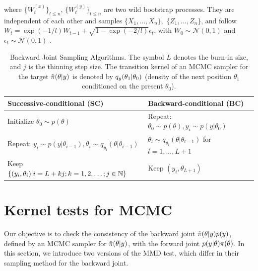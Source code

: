 \documentclass{article}
\newcommand{\tildepi}{\tilde{\pi}}
\begin{document}
where $\{W_{t}^{(x)}\}_{t\leq n}$, $\{W_{t}^{(y)}\}_{t\leq n}$ are two wild bootstrap processes.
They are independent of each other and samples $\{X_1, \dots, X_n\},$ $\{Z_1, \dots, Z_n\}$, and follow $W_{t}=\exp(-1/l) W_{t-1}+\sqrt{1-\exp(-2/{l})}\epsilon_{t}$,
with $W_{0} \sim \mathcal{N}(0,1)$ and $\epsilon_{t} \sim \mathcal{N}(0,1)$ \cite[see, ][]{chwialkowski_wild_2014, leucht_dependent_2013}.


\begin{table}[b]
    \caption{Backward Joint Sampling Algorithms. The symbol $L$ denotes the burn-in size, and $j$ is the thinning step size.
    The transition kernel of an MCMC sampler for the target $\tildepi(\theta\given y)$ is denoted by $q_{y}(\theta_{1} \vert \theta_0)$ (density of the next position $\theta_1$ conditioned on the present $\theta_0$). 
    }
    \label{tab:sampling}
    \centering
    \begin{tabular}{l|l}
    \toprule
        Successive-conditional (SC) & Backward-conditional (BC) \\
    \midrule  
    
    Initialize $\theta_{0} \sim p(\theta)$                                      & Repeat: $\theta_{0} \sim p(\theta), y_{i} \sim p(y|\theta_{0})$ \\
    Repeat: $y_{i} \sim p(y|\theta_{i-1}), \theta_{i} \sim q_{y_i}(\theta|\theta_{i-1})$   & \qquad $\theta_{l} \sim q_{y_i}(\theta|\theta_{l-1})$ for $l=1,...,L+1$ \\
    Keep $\{(y_{i}, \theta_{i}) \vert i=L+kj; k=1,2,\ldots; j\in\mathbb{N} \}$                     & \qquad Keep $(y_{i}, \theta_{L+1})$ \\
    \bottomrule
    \end{tabular}
\end{table}
\section{Kernel tests for MCMC}
Our objective is to check the consistency of the backward joint $\tildepi(\theta \given y) p(y)$, defined by an MCMC sampler for $\tildepi(\theta\given y)$, with the forward joint $p(y\vert \theta)\pi(\theta).$
In this section, we introduce two versions of the MMD test, which differ in their sampling method for the backward joint.  
\end{document}
